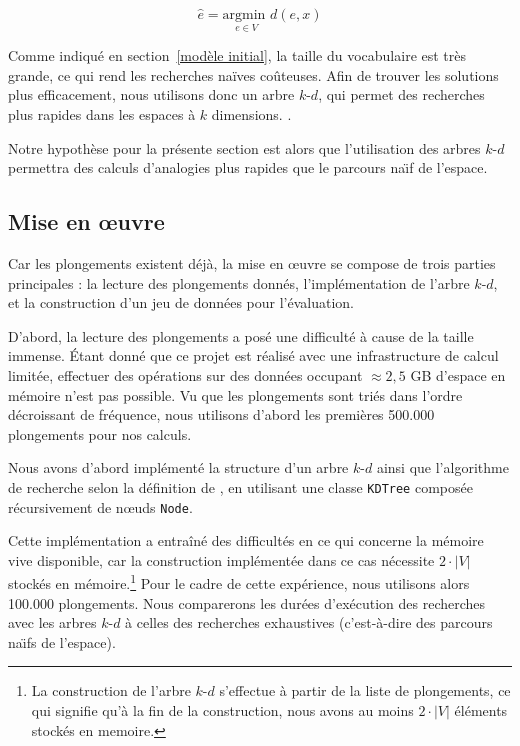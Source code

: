 \documentclass[12pt]{article}
\begin{document}
\begin{equation}\label{eq:dist}
    \hat{e} = \underset{e \in V}{\text{argmin }} d(e, x)
\end{equation}

Comme indiqué en section~\ref{modèle initial}, la taille du vocabulaire est très grande, ce qui rend les recherches naïves coûteuses. Afin de trouver les solutions plus efficacement, nous utilisons donc un arbre $k$-$d$, qui permet des recherches plus rapides dans les espaces à $k$ dimensions. \citep{bentley1975multidimensional}. 

Notre hypothèse pour la présente section est alors que l'utilisation des arbres $k$-$d$ permettra des calculs d'analogies plus rapides que le parcours na\"\i f de l'espace.

\subsection{Mise en œuvre} \label{mise en œuvre-2}

Car les plongements existent déjà, la mise en œuvre se compose de trois parties principales : la lecture des plongements donnés, l'implémentation de l'arbre $k$-$d$, et la construction d'un jeu de données pour l'évaluation.

D'abord, la lecture des plongements a posé une difficulté à cause de la taille immense. Étant donné que ce projet est réalisé avec une infrastructure de calcul limitée, effectuer des opérations sur des données occupant $\approx 2{,}5$ GB d'espace en mémoire n'est pas possible. Vu que les plongements sont triés dans l'ordre décroissant de fréquence, nous utilisons d'abord les premières 500.000 plongements pour nos calculs.

Nous avons d'abord implémenté la structure d'un arbre $k$-$d$ ainsi que l'algorithme de recherche selon la définition de \cite{friedman1977algorithm}, en utilisant une classe \texttt{KDTree} composée récursivement de nœuds \texttt{Node}.

Cette implémentation a entraîné des difficultés en ce qui concerne la mémoire vive disponible, car la construction implémentée dans ce cas nécessite $2 \cdot |V|$ stockés en mémoire.\footnote{La construction de l'arbre $k$-$d$ s'effectue à partir de la liste de plongements, ce qui signifie qu'à la fin de la construction, nous avons au moins $2 \cdot |V|$ éléments stockés en memoire.} Pour le cadre de cette expérience, nous utilisons alors 100.000 plongements. Nous comparerons les durées d'exécution des recherches avec les arbres $k$-$d$ à celles des recherches exhaustives (c'est-à-dire des parcours na\"\i fs de l'espace).
\end{document}
